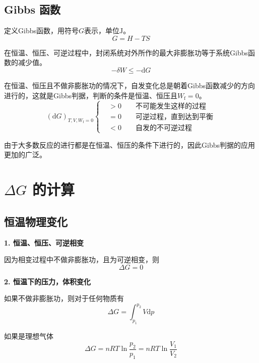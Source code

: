 \documentclass[lang=cn,newtx,11pt,scheme=chinese]{elegantbook}
\begin{document}
\subsection{Gibbs 函数}
定义Gibbs函数，用符号$G$表示，单位$\mathrm{J}$。
\begin{equation}
	G=H-TS
\end{equation}

在恒温、恒压、可逆过程中，封闭系统对外所作的最大非膨胀功等于系统Gibbs函数的减少值。
\begin{equation}
	-\delta W \leqslant -\mathrm{d}G
\end{equation}

在恒温、恒压且不做非膨胀功的情况下，自发变化总是朝着Gibbs函数减少的方向进行的，这就是Gibbs判据，判断的条件是恒温、恒压且$W_\mathrm{f}=0$。
\begin{equation}
	(\mathrm{d}G)_{T,V,W_\mathrm{f}=0} \left\{
	\begin{aligned}
		&> 0 \qquad \text{不可能发生这样的过程} \\
		&= 0 \qquad \text{可逆过程，直到达到平衡}\\
		&< 0 \qquad \text{自发的不可逆过程} 
	\end{aligned}
	\right.
\end{equation}

由于大多数反应的进行都是在恒温、恒压的条件下进行的，因此Gibbs判据的应用更加的广泛。

\section{$\Delta G$ 的计算}
\subsection{恒温物理变化}

\textbf{1. 恒温、恒压、可逆相变}

因为相变过程中不做非膨胀功，且为可逆相变，则
\begin{equation}
	\Delta G =0
\end{equation}

\textbf{2. 恒温下的压力，体积变化}

如果不做非膨胀功，则对于任何物质有
\begin{equation}
	\Delta G = \int_{p_1}^{p_2} V\mathrm{d}p
\end{equation}

如果是理想气体
\begin{equation}
	\Delta G = nRT\ln \frac{p_2}{p_1}=nRT\ln \frac{V_1}{V_2}
\end{equation}
\end{document}
